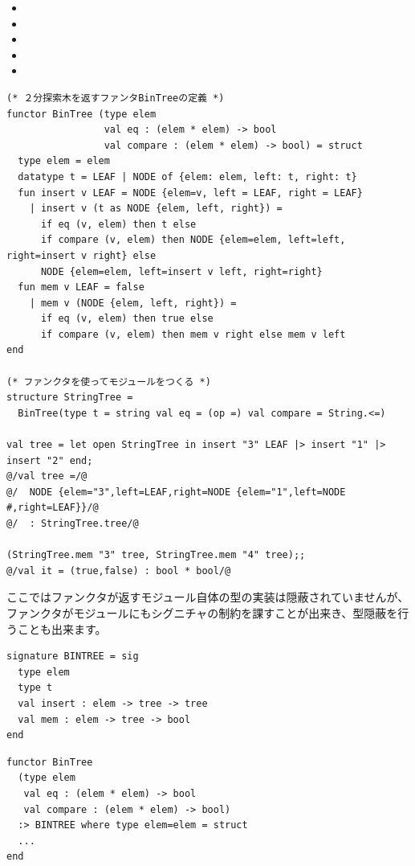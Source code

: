 \documentclass[11pt,a4paper]{jarticle}
\begin{document}
\begin{itemize}
\item {}
\item {}
\item {}
\item {}
\item {}
\end{itemize}
\begin{lstlisting}[caption=ファンクタの例]
(* ２分探索木を返すファンタBinTreeの定義 *)
functor BinTree (type elem
                 val eq : (elem * elem) -> bool
                 val compare : (elem * elem) -> bool) = struct
  type elem = elem
  datatype t = LEAF | NODE of {elem: elem, left: t, right: t}
  fun insert v LEAF = NODE {elem=v, left = LEAF, right = LEAF}
    | insert v (t as NODE {elem, left, right}) =
      if eq (v, elem) then t else
      if compare (v, elem) then NODE {elem=elem, left=left, right=insert v right} else
      NODE {elem=elem, left=insert v left, right=right}
  fun mem v LEAF = false
    | mem v (NODE {elem, left, right}) =
      if eq (v, elem) then true else
      if compare (v, elem) then mem v right else mem v left
end

(* ファンクタを使ってモジュールをつくる *)
structure StringTree =
  BinTree(type t = string val eq = (op =) val compare = String.<=)

val tree = let open StringTree in insert "3" LEAF |> insert "1" |> insert "2" end;
@/val tree =/@
@/  NODE {elem="3",left=LEAF,right=NODE {elem="1",left=NODE #,right=LEAF}}/@
@/  : StringTree.tree/@

(StringTree.mem "3" tree, StringTree.mem "4" tree);;
@/val it = (true,false) : bool * bool/@
\end{lstlisting}

ここではファンクタが返すモジュール自体の型の実装は隠蔽されていませんが、
ファンクタがモジュールにもシグニチャの制約を課すことが出来き、型隠蔽を行うことも出来ます。

\begin{minipage}[htb]{0.45\textwidth}
\begin{lstlisting}[caption=２分木のシグニチャ]
signature BINTREE = sig
  type elem
  type t
  val insert : elem -> tree -> tree
  val mem : elem -> tree -> bool
end
\end{lstlisting}
\end{minipage}
\hfill
\begin{minipage}[htb]{0.55\textwidth}
\begin{lstlisting}[caption=BinTreeの再定義,label=code:bin-tree-with-sig]
functor BinTree
  (type elem
   val eq : (elem * elem) -> bool
   val compare : (elem * elem) -> bool)
  :> BINTREE where type elem=elem = struct
  ...
end
\end{lstlisting}
\end{minipage}
\end{document}

